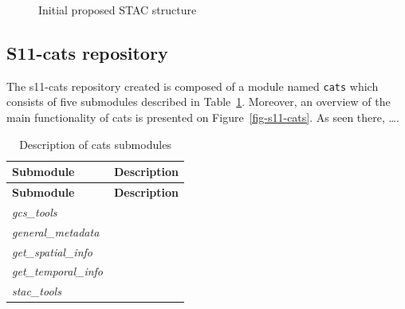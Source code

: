 \documentclass[
  oneside,
  open=any]{scrbook}
\begin{document}
\begin{figure}[H]


\caption{\label{fig-stac-str}Initial proposed STAC structure}

\end{figure}%

\subsection{S11-cats repository}\label{s11-cats-repository}

The s11-cats repository created is composed of a module named
\texttt{cats} which consists of five submodules described in
Table~\ref{tbl-cats-modules}. Moreover, an overview of the main
functionality of cats is presented on Figure~\ref{fig-s11-cats}. As seen
there, \ldots.

\begin{longtable}[]{@{}ll@{}}
\caption{Description of cats
submodules}\label{tbl-cats-modules}\tabularnewline
\toprule\noalign{}
\textbf{Submodule} & \textbf{Description} \\
\midrule\noalign{}
\endfirsthead
\toprule\noalign{}
\textbf{Submodule} & \textbf{Description} \\
\midrule\noalign{}
\endhead
\bottomrule\noalign{}
\endlastfoot
\emph{gcs\_tools} & \\
\emph{general\_metadata} & \\
\emph{get\_spatial\_info} & \\
\emph{get\_temporal\_info} & \\
\emph{stac\_tools} & \\
\end{longtable}
\end{document}
